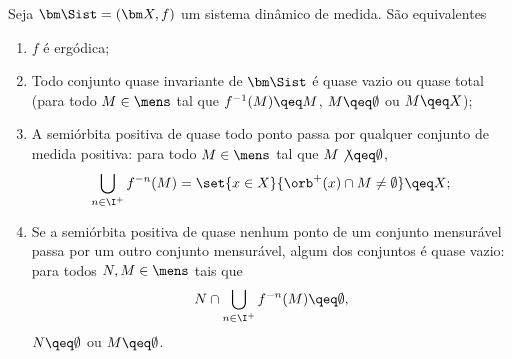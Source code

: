 \begin{proposition}
Seja $\bm\Sist=(\bm X,f)$ um sistema dinâmico de medida. São equivalentes
	\begin{enumerate}
	\item $f$ é ergódica;
	\item Todo conjunto quase invariante de $\bm\Sist$ é quase vazio ou quase total (para todo $M \in \mens$ tal que $f^{-1}(M) \qeq M$, $M \qeq \emptyset$ ou $M \qeq X$);
	\item A semiórbita positiva de quase todo ponto passa por qualquer conjunto de medida positiva: para todo $M \in \mens$ tal que $M \not\qeq \emptyset$,
		\begin{equation*}
		\bigcup_{n \in \I^+} f^{-n}(M) = \set{x \in X}{\orb^+(x) \cap M \neq \emptyset} \qeq X;
		\end{equation*}
	\item Se a semiórbita positiva de quase nenhum ponto de um conjunto mensurável passa por um outro conjunto mensurável, algum dos conjuntos é quase vazio: para todos $N,M \in \mens$ tais que
	\begin{equation*}
	N \cap \bigcup_{n \in \I^+}f^{-n}(M) \qeq \emptyset,
	\end{equation*}
$N \qeq \emptyset$ ou $M \qeq \emptyset$.
	\end{enumerate}
\end{proposition}
